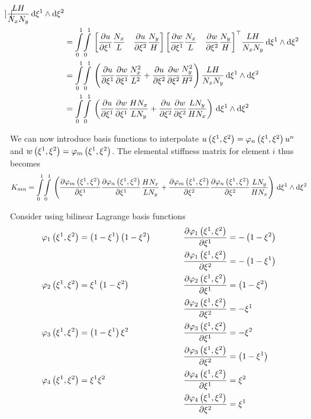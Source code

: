 \begin{equation}
\begin{aligned}
{{\begin{bmatrix}
    \end{bmatrix}}}\dfrac{LH}{N_{x}N_{y}}\,\exteriorderivop\xione\wedge\exteriorderivop\xitwo \\
    &=\giint{0}{1}{0}{1}{\begin{bmatrix}\delby{u}{\xione}\dfrac{N_{x}}{L}&\delby{u}{\xitwo}\dfrac{N_{y}}{H}\end{bmatrix}
      \transpose{\begin{bmatrix}\delby{w}{\xione}\dfrac{N_{x}}{L}&\delby{w}{\xitwo}\dfrac{N_{y}}{H}\end{bmatrix}}
      \dfrac{LH}{N_{x}N_{y}}}{\xione}{\xitwo}\\
    &=\giint{0}{1}{0}{1}{\pbrac{\delby{u}{\xione}\delby{w}{\xione}\dfrac{N_{x}^{2}}{L^{2}}+
        \delby{u}{\xitwo}\delby{w}{\xitwo}\dfrac{N_{y}^{2}}{H^{2}}}\dfrac{LH}{N_{x}N_{y}}}{\xione}{\xitwo}\\
    &=\giint{0}{1}{0}{1}{\pbrac{\delby{u}{\xione}\delby{w}{\xione}\dfrac{H N_{x}}{L N_{y}}+
        \delby{u}{\xitwo}\delby{w}{\xitwo}\dfrac{L N_{y}}{H N_{x}}}}{\xione}{\xitwo}
  \end{aligned}
\end{equation}

We can now introduce basis functions to interpolate
$\fnof{u}{\xione,\xitwo}=\lbfn{n}{\xione,\xitwo}\nodept{u}{n}$ and
$\fnof{w}{\xione,\xitwo}=\lbfn{m}{\xione,\xitwo}$. The elemental
stiffness matrix for element $i$ thus becomes
\begin{equation}
  K_{mn}=\giint{0}{1}{0}{1}{\pbrac{\delby{\lbfn{m}{\xione,\xitwo}}{\xione}\delby{\lbfn{n}{\xione,\xitwo}}{\xione}
      \dfrac{H N_{x}}{L N_{y}}+\delby{\lbfn{m}{\xione,\xitwo}}{\xitwo}\delby{\lbfn{n}{\xione,\xitwo}}{\xitwo}
      \dfrac{L N_{y}}{H N_{x}}}}{\xione}{\xitwo}
\end{equation}

Consider using bilinear Lagrange basis functions \ie 
\begin{alignat*}{3}
  \lbfn{1}{\xione,\xitwo}&=\pbrac{1-\xione}\pbrac{1-\xitwo}&\quad&&\delby{\lbfn{1}{\xione,\xitwo}}{\xione}&=-\pbrac{1-\xitwo}\\
  &&&&\delby{\lbfn{1}{\xione,\xitwo}}{\xitwo}&=-\pbrac{1-\xione} \\
  \lbfn{2}{\xione,\xitwo}&=\xione\pbrac{1-\xitwo}&\qquad&&\delby{\lbfn{2}{\xione,\xitwo}}{\xione}&=\pbrac{1-\xitwo}\\
  &&&&\delby{\lbfn{2}{\xione,\xitwo}}{\xitwo}&=-\xione\\
  \lbfn{3}{\xione,\xitwo}&=\pbrac{1-\xione}\xitwo&\qquad&&\delby{\lbfn{3}{\xione,\xitwo}}{\xione}&=-\xitwo\\
  &&&&\delby{\lbfn{3}{\xione,\xitwo}}{\xitwo}&=\pbrac{1-\xione}\\
  \lbfn{4}{\xione,\xitwo}&=\xione\xitwo&\qquad&&\delby{\lbfn{4}{\xione,\xitwo}}{\xione}&=\xitwo\\
  &&&&\delby{\lbfn{4}{\xione,\xitwo}}{\xitwo}&=\xione
\end{alignat*}


